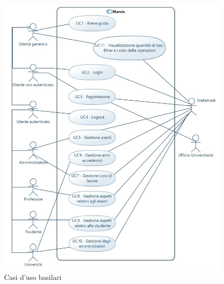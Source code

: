 \documentclass[AnalisiDeiRequisiti.tex]{subfiles}
\begin{document}
\begin{figure}[H]
	\centering
	\includegraphics[width=0.8\linewidth]{UC.jpg}
	\caption{Casi d'uso basilari}
	\label{fig:Casi d'uso basilari}
\end{figure}
\end{document}
